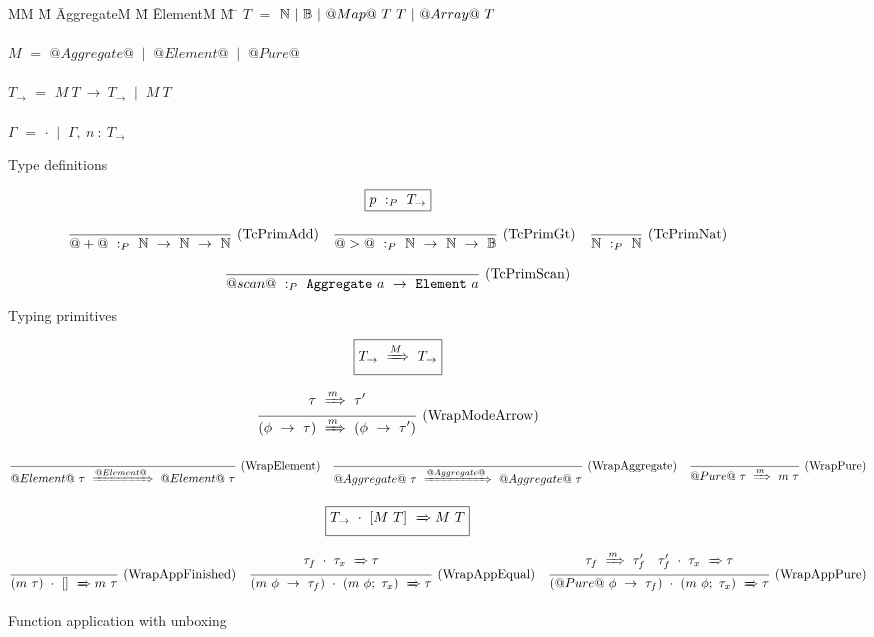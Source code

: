 
\begin{figure}

\begin{tabbing}
MM \= M \= AggregateM \= M \= ElementM \= M \= \kill
$T$
    \> $=$  \> $\mathbb{N}~|~\mathbb{B}~|~@Map@~T~T~|~@Array@~T$ \\
\\
$M$
    \> $=$  \> $@Aggregate@$ \> $~|~$ \> $@Element@$ \> $~|~$ \> $@Pure@$         \\
\\
$T_{\to}$
    \> $=$  
            \> $M~T~\to~T_{\to}$
            \> $~|~$
            \> $M~T$ \\
\\
$\Gamma$
    \> $=$  
            \> $\cdot$
            \> $~|~$
            \> $\Gamma,~n~:~T_\to$ \\
\end{tabbing}

\caption{Type definitions}
\label{fig:source:type:defs}
\end{figure}


\begin{figure*}

$$
\boxed{p ~:_{P}~ T_\to}
$$


$$
\frac {\displaystyle 
} {\displaystyle  
    @+@ ~:_{P}~ \mathbb{N}~\to~\mathbb{N}~\to~\mathbb{N}
} \ 
\textrm{(TcPrimAdd)}
\quad
\frac {\displaystyle 
} {\displaystyle 
    @>@ ~:_{P}~ \mathbb{N}~\to~\mathbb{N}~\to~\mathbb{B}
} \ 
\textrm{(TcPrimGt)}
\quad
\frac {\displaystyle 
} {\displaystyle  
    \mathbb{N} ~:_{P}~ \mathbb{N}
} \ 
\textrm{(TcPrimNat)}
$$

$$
\frac {\displaystyle 
} {\displaystyle  
    @scan@ ~:_{P}~ \mathtt{Aggregate}~a~\to~\mathtt{Element}~a
} \ 
\textrm{(TcPrimScan)}
$$

\caption{Typing primitives}
\label{fig:source:type:prim}
\end{figure*}


\begin{figure*}

$$
\boxed{T_{\to} ~\xRightarrow{M}~ T_{\to}}
$$

$$
\frac {\displaystyle 
    \tau ~\xRightarrow{m}~ \tau'
} {\displaystyle 
    (\phi~\to~\tau) ~\xRightarrow{m}~ (\phi~\to~\tau')
} \ 
\textrm{(WrapModeArrow)}
$$

$$
\frac {\displaystyle  } {\displaystyle 
    @Element@~\tau ~\xRightarrow{@Element@}~ @Element@~\tau
} \ 
\textrm{(WrapElement)}
\quad
\frac {\displaystyle  } {\displaystyle 
    @Aggregate@~\tau ~\xRightarrow{@Aggregate@}~ @Aggregate@~\tau
} \ 
\textrm{(WrapAggregate)}
\quad
\frac {\displaystyle  } {\displaystyle 
    @Pure@~\tau ~\xRightarrow{m}~ m~\tau
} \ 
\textrm{(WrapPure)}
$$


$$
\boxed{T_{\to}~\cdot~[M~T] ~\xRightarrow~ M~T}
$$

$$
\frac {\displaystyle 
} {\displaystyle 
    (m~\tau)~\cdot~[] ~\xRightarrow~ m~\tau
} \ 
\textrm{(WrapAppFinished)}
\quad
\frac {\displaystyle 
    \tau_f~\cdot~\tau_x ~\xRightarrow~ \tau
} {\displaystyle 
    (m~\phi~\to~\tau_f)~\cdot~(m~\phi;~\tau_x) ~\xRightarrow~ \tau
} \ 
\textrm{(WrapAppEqual)}
\quad
\frac {\displaystyle 
    \tau_f ~\xRightarrow{m}~ \tau_f'
    \quad
    \tau_f'~\cdot~\tau_x ~\xRightarrow~ \tau
} {\displaystyle 
    (@Pure@~\phi~\to~\tau_f)~\cdot~(m~\phi;~\tau_x) ~\xRightarrow~ \tau
} \ 
\textrm{(WrapAppPure)}
$$

\caption{Function application with unboxing}
\label{fig:source:type:wrap}
\end{figure*}

